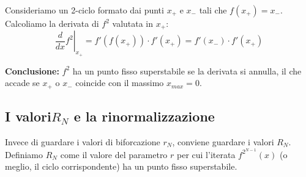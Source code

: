 \documentclass[openany]{book}
\theoremstyle{definition}
\theoremstyle{remark}
\begin{document}
Consideriamo un 2-ciclo formato dai punti $x_+$ e $x_-$ tali che $f(x_+) = x_-$. 
Calcoliamo la derivata di $f^2$ valutata in $x_+$:
\begin{equation}
    \left. \frac{d}{dx} f^2 \right|_{x_+} = f'(f(x_+)) \cdot f'(x_+) = f'(x_-) \cdot f'(x_+)
\end{equation}

\textbf{Conclusione:} $f^2$ ha un punto fisso superstabile se la derivata si annulla, il che accade se $x_+$ o $x_-$ coincide con il massimo $x_{max} = 0$.


\subsection{I valori\texorpdfstring{$R_N$}{RN} e la rinormalizzazione}
Invece di guardare i valori di biforcazione $r_N$, conviene guardare i valori $R_N$. 
Definiamo $R_N$ come il valore del parametro $r$ per cui l'iterata $f^{2^{N-1}}(x)$ (o meglio, il ciclo corrispondente) ha un punto fisso superstabile.
\end{document}
